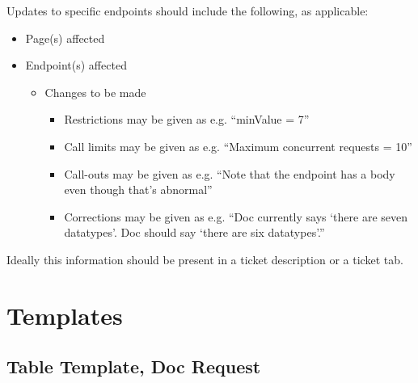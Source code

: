 \documentclass[a4paper]{article}
\begin{document}
Updates to specific endpoints should include the following, as applicable:
\begin{itemize}
	\item Page(s) affected
	\item Endpoint(s) affected
	\begin{itemize}
		\item Changes to be made
		\begin{itemize}
			\item Restrictions may be given as e.g. ``minValue = 7''
			\item Call limits may be given as e.g. ``Maximum concurrent requests = 10''
			\item Call-outs may be given as e.g. ``Note that the endpoint has a body even though that's abnormal''
			\item Corrections may be given as e.g. ``Doc currently says `there are seven datatypes'. Doc should say `there are six datatypes'.''
		\end{itemize}
	\end{itemize}
\end{itemize}

Ideally this information should be present in a ticket description or a ticket tab.

\clearpage

\section*{Templates}
\subsection*{Table Template, Doc Request}
\end{document}
